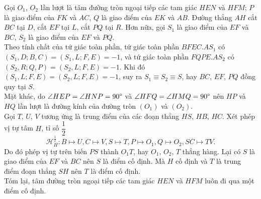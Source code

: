 \begin{center}
        \end{center}

        \begin{solution}
            Gọi \(O_1\), \(O_2\) lần lượt là tâm đường tròn ngoại tiếp các tam giác \(HEN\) và \(HFM\); \(P\) là giao điểm của \(FK\) và \(AC\), \(Q\) là giao điểm của \(EK\) và \(AB\). Đường thẳng \(AH\) cắt \(BC\) tại \(D\), cắt \(EF\) tại \(L\), cắt \(PQ\) tại \(R\). Hơn nữa, gọi \(S_1\) là giao điểm của \(EF\) và \(BC\), \(S_2\) là giao điểm của \(EF\) và \(PQ\).\\
            Theo tính chất của tứ giác toàn phần, tứ giác toàn phần \(BFEC.AS_1\) có \((S_1,D;B,C) = (S_1,L;F,E) = -1\), và tứ giác toàn phần \(FQPE.AS_2\) có \((S_2,R;Q,P) = (S_2,L;F,E) = -1\). Khi đó \((S_1,L;F,E) = (S_2,L;F,E) = -1\), suy ra \(S_1 \equiv S_2 \equiv S\), hay \(BC\), \(EF\), \(PQ\) đồng quy tại \(S\).\\
            Mặt khác, do \(\angle HEP = \angle HNP = 90 \degree\) và \(\angle HFQ = \angle HMQ = 90 \degree\) nên \(HP\) và \(HQ\) lần lượt là đường kính của đường tròn \((O_1)\) và \((O_2)\).\\
            Gọi \(T\), \(U\), \(V\) tương ứng là trung điểm của các đoạn thẳng \(HS\), \(HB\), \(HC\). Xét phép vị tự tâm \(H\), tỉ số \(\dfrac{1}{2}\)
            \[\mathcal{H}_{H}^{\frac{1}{2}}: B \mapsto U, C \mapsto V, S \mapsto T, P \mapsto O_1, Q \mapsto O_2, SC \mapsto TV.\]
            Do đó phép vị tự trên biến \(PS\) thành \(O_1T\), hay \(O_1\), \(O_2\), \(T\) thẳng hàng. Lại có \(S\) là giao điểm của \(EF\) và \(BC\) nên \(S\) là điểm cố định. Mà \(H\) cố định và \(T\) là trung điểm đoạn thẳng \(SH\) nên \(T\) là điểm cố định.\\
            Tóm lại, tâm đường tròn ngoại tiếp các tam giác \(HEN\) và \(HFM\) luôn đi qua một điểm cố định.
        \end{solution}


